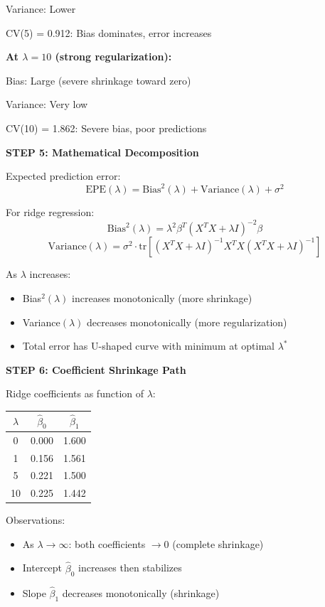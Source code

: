 \documentclass[12pt]{article}
\begin{document}
\begin{solution}
Variance: Lower

CV(5) = 0.912: Bias dominates, error increases

\textbf{At $\lambda = 10$ (strong regularization):}

Bias: Large (severe shrinkage toward zero)

Variance: Very low

CV(10) = 1.862: Severe bias, poor predictions

\textbf{STEP 5: Mathematical Decomposition}

Expected prediction error:
\[\text{EPE}(\lambda) = \text{Bias}^2(\lambda) + \text{Variance}(\lambda) + \sigma^2\]

For ridge regression:
\[\text{Bias}^2(\lambda) = \lambda^2 \beta^T(X^TX + \lambda I)^{-2}\beta\]
\[\text{Variance}(\lambda) = \sigma^2 \cdot \text{tr}\left[(X^TX + \lambda I)^{-1}X^TX(X^TX + \lambda I)^{-1}\right]\]

As $\lambda$ increases:
\begin{itemize}
\item Bias$^2(\lambda)$ increases monotonically (more shrinkage)
\item Variance$(\lambda)$ decreases monotonically (more regularization)
\item Total error has U-shaped curve with minimum at optimal $\lambda^*$
\end{itemize}

\textbf{STEP 6: Coefficient Shrinkage Path}

Ridge coefficients as function of $\lambda$:

\begin{center}
\begin{tabular}{c|cc}
\hline
$\lambda$ & $\hat{\beta}_0$ & $\hat{\beta}_1$ \\
\hline
0 & 0.000 & 1.600 \\
1 & 0.156 & 1.561 \\
5 & 0.221 & 1.500 \\
10 & 0.225 & 1.442 \\
\hline
\end{tabular}
\end{center}

Observations:
\begin{itemize}
\item As $\lambda \to \infty$: both coefficients $\to 0$ (complete shrinkage)
\item Intercept $\hat{\beta}_0$ increases then stabilizes
\item Slope $\hat{\beta}_1$ decreases monotonically (shrinkage)
\end{itemize}


\end{solution}
\end{document}
